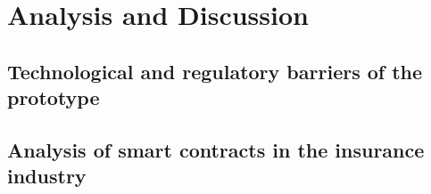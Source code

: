 \chapter{Analysis and Discussion}\label{chapter:analysis_discussion}
\section{Technological and regulatory barriers of the prototype}\label{section:technological_regulatory_barriers}
\section{Analysis of smart contracts in the insurance industry}\label{section:analysis_smart_contracts_insurance}
